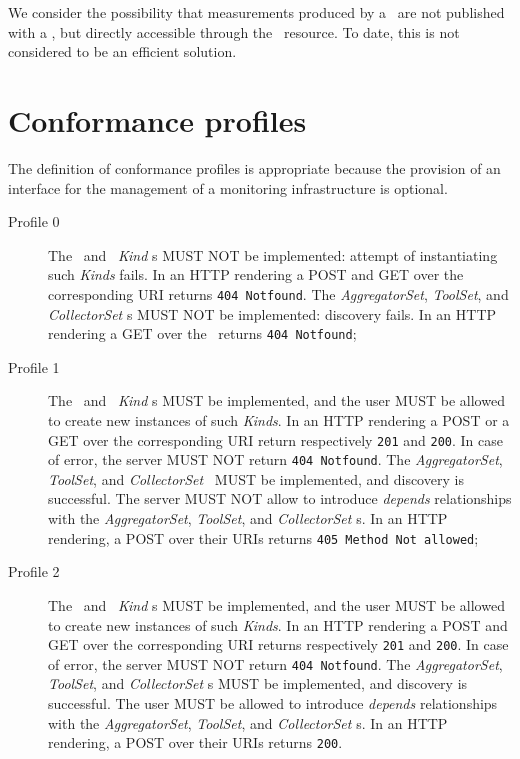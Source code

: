 \documentclass[12pt]{article}  %
\begin{document}
We consider the possibility that measurements produced by a \sens\ are not published with a \coll , but directly accessible through the \sens\ resource. To date, this is not considered to be an efficient solution.


\section{Conformance profiles}

The definition of conformance profiles is appropriate because the provision of an interface for the management of a monitoring infrastructure is optional. 

\begin{description}

\item[Profile 0] The \coll\ and \sens\ {\em Kind} s MUST NOT be implemented: attempt of instantiating such {\em Kinds} fails.  In an HTTP rendering a POST and GET over the corresponding URI returns {\tt 404 Notfound}. The {\em AggregatorSet}, {\em ToolSet}, and {\em CollectorSet} \mi s MUST NOT be implemented: discovery fails. In an HTTP rendering a GET over the \mi\ returns {\tt 404 Notfound}; 

\item[Profile 1] The \coll\ and \sens\ {\em Kind} s MUST be implemented, and the user MUST be allowed to create new instances of such {\em Kinds}.  In an HTTP rendering a POST or a GET over the corresponding URI return respectively {\tt 201} and {\tt 200}. In case of error, the server MUST NOT return {\tt 404 Notfound}. The {\em AggregatorSet}, {\em ToolSet}, and {\em CollectorSet} \mi\ MUST be implemented, and discovery is successful. The server MUST NOT allow to introduce {\em depends} relationships with the {\em AggregatorSet}, {\em ToolSet}, and {\em CollectorSet} \mi s. In an HTTP rendering, a POST over their URIs returns {\tt 405 Method Not allowed}; 

\item[Profile 2]  The \coll\ and \sens\ {\em Kind} s MUST be implemented, and the user MUST be allowed to create new instances of such {\em Kinds}.  In an HTTP rendering a POST and GET over the corresponding URI returns respectively {\tt 201} and {\tt 200}. In case of error, the server MUST NOT return {\tt 404 Notfound}. The {\em AggregatorSet}, {\em ToolSet}, and {\em CollectorSet} \mi s MUST be implemented, and discovery is successful. The user MUST be allowed to introduce {\em depends} relationships with the  {\em AggregatorSet}, {\em ToolSet}, and {\em CollectorSet} \mi s. In an HTTP rendering, a POST over their URIs returns {\tt 200}.

\end{description}
\end{document}
